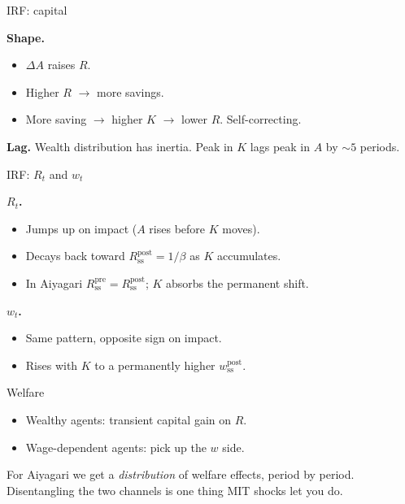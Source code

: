 \documentclass[10pt,aspectratio=169]{beamer}
\begin{document}
\begin{frame}{IRF: capital}

\textbf{Shape.}

\begin{itemize}
  \item $\Delta A$ raises $R$.
  \item Higher $R$ $\to$ more savings.
  \item More saving $\to$ higher $K$ $\to$ lower $R$. Self-correcting.
\end{itemize}

\vspace{0.4em}

\textbf{Lag.} Wealth distribution has inertia. Peak in $K$ lags peak in $A$ by $\sim 5$ periods.

\end{frame}

\begin{frame}{IRF: $R_t$ and $w_t$}

\textbf{$R_t$.}

\begin{itemize}
  \item Jumps up on impact ($A$ rises before $K$ moves).
  \item Decays back toward $R^{\mathrm{post}}_{\mathrm{ss}} = 1/\beta$ as $K$ accumulates.
  \item In Aiyagari $R^{\mathrm{pre}}_{\mathrm{ss}} = R^{\mathrm{post}}_{\mathrm{ss}}$; $K$ absorbs the permanent shift.
\end{itemize}

\textbf{$w_t$.}

\begin{itemize}
  \item Same pattern, opposite sign on impact.
  \item Rises with $K$ to a permanently higher $w^{\mathrm{post}}_{\mathrm{ss}}$.
\end{itemize}

\end{frame}

\begin{frame}{Welfare}

\begin{itemize}
  \item Wealthy agents: transient capital gain on $R$.
  \item Wage-dependent agents: pick up the $w$ side.
\end{itemize}

\vspace{0.6em}

For Aiyagari we get a \emph{distribution} of welfare effects, period by period. Disentangling the two channels is one thing MIT shocks let you do.

\end{frame}
\end{document}

